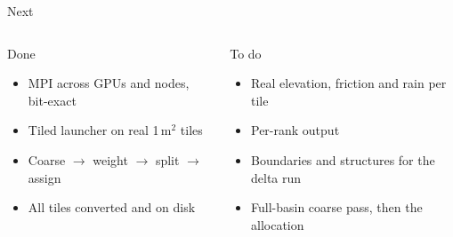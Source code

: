 \documentclass[aspectratio=169]{beamer}
\begin{document}
\begin{frame}{Next}
  \begin{columns}[T,onlytextwidth]
      \begin{block}{Done}
        \begin{itemize}
          \item MPI across GPUs and nodes, bit-exact
          \item Tiled launcher on real 1\,m$^2$ tiles
          \item Coarse $\to$ weight $\to$ split $\to$ assign
          \item All tiles converted and on disk
        \end{itemize}
      \end{block}
      \begin{block}{To do}
        \begin{itemize}
          \item Real elevation, friction and rain per tile
          \item Per-rank output
          \item Boundaries and structures for the delta run
          \item Full-basin coarse pass, then the allocation
        \end{itemize}
      \end{block}
  \end{columns}
\end{frame}
\end{document}
